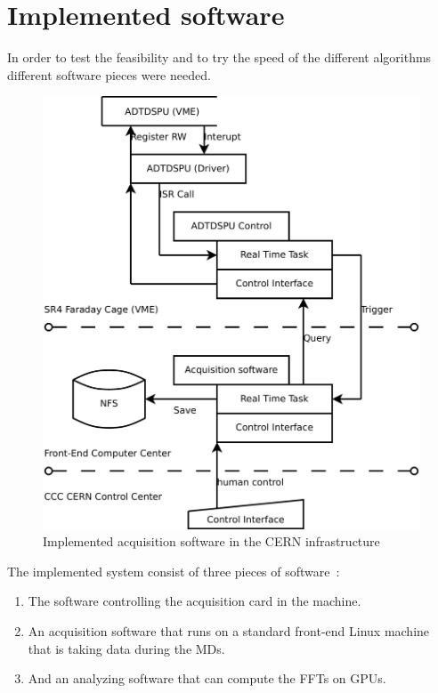 \chapter{Implemented software}

In order to test the feasibility and to try the speed of the different algorithms different software pieces were needed.

\begin{figure}[H]
\caption{Implemented acquisition software in the CERN infrastructure}
\centering
\includegraphics[scale=0.3]{ImplementedSoftFesa.pdf}
\end{figure}

The implemented system consist of three pieces of software~:
\begin{enumerate}
\item The software controlling the acquisition card in the machine.
\item An acquisition software that runs on a standard front-end Linux machine that is taking data during the \glspl{MD}.
\item And an analyzing software that can compute the \glspl{FFT} on \glspl{GPU}.
\end{enumerate}

